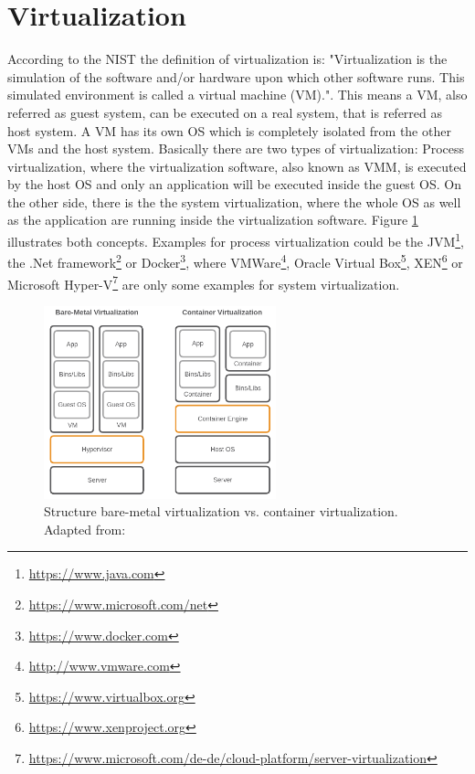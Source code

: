 \section{Virtualization}
\label{section:state_virtualization}
According to the \ac{NIST} the definition of virtualization is: "Virtualization is the simulation of the software and/or hardware upon which other software runs. This simulated environment is called a virtual machine (VM)."\autocite[p. ES-1]{Sca:2011}.
This means a \ac{VM}, also referred as guest system, can be executed on a real system, that is referred as host system.
A \ac{VM} has its own \ac{OS} which is completely isolated from the other \acp{VM} and the host system.\autocite[cf.][p. 2]{Celesti:2016}
Basically there are two types of virtualization: Process virtualization, where the virtualization software, also known as \ac{VMM}, is executed by the host \ac{OS} and only an application will be executed inside the guest \ac{OS}.
On the other side, there is the the system virtualization, where the whole \ac{OS} as well as the application are running inside the virtualization software.
Figure \ref{fig:vms_vs_docker} illustrates both concepts.
Examples for process virtualization could be the \ac{JVM}\footnote{\url{https://www.java.com}}, the .Net framework\footnote{\url{https://www.microsoft.com/net}} or Docker\footnote{\url{https://www.docker.com}}, where VMWare\footnote{\url{http://www.vmware.com}}, Oracle Virtual Box\footnote{\url{https://www.virtualbox.org}}, XEN\footnote{\url{https://www.xenproject.org}} or Microsoft Hyper-V\footnote{\url{https://www.microsoft.com/de-de/cloud-platform/server-virtualization}} are only some examples for system virtualization.

\begin{figure}[H]
    \centering
    \includegraphics[width=0.6\textwidth]{resources/images/vm_vs_container.png}
    \caption[Structure bare-metal virtualization vs. container virtualization]{Structure bare-metal virtualization vs. container virtualization. Adapted from: \autocite[p. 2]{Gallagher:2015}}
    \label{fig:vms_vs_docker}
\end{figure}

